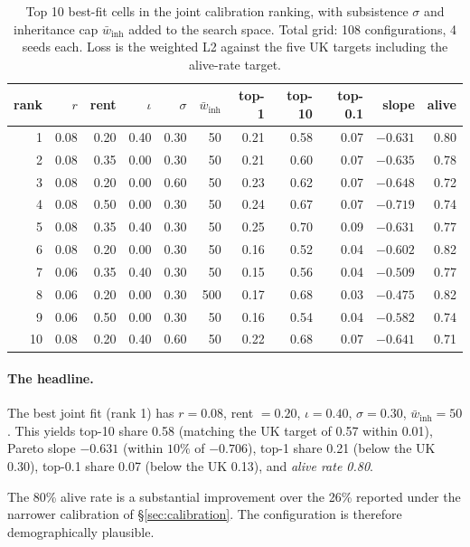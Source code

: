 \documentclass[11pt]{article}
\begin{document}
\begin{table}[h]
\centering
\small
\caption{Top 10 best-fit cells in the joint calibration ranking,
with subsistence $\sigma$ and inheritance cap $\bar{w}_\text{inh}$
added to the search space.  Total grid: 108 configurations, 4 seeds
each.  Loss is the weighted L2 against the five UK targets including
the alive-rate target.}
\label{tab:joint-cal}
\begin{tabular}{rrrrrrrrrrr}
\toprule
rank & $r$ & rent & $\iota$ & $\sigma$ & $\bar{w}_\text{inh}$
& top-1 & top-10 & top-0.1 & slope & alive \\
\midrule
  1 & 0.08 & 0.20 & 0.40 & 0.30 &  50 & 0.21 & 0.58 & 0.07 & $-0.631$ & 0.80 \\
  2 & 0.08 & 0.35 & 0.00 & 0.30 &  50 & 0.21 & 0.60 & 0.07 & $-0.635$ & 0.78 \\
  3 & 0.08 & 0.20 & 0.00 & 0.60 &  50 & 0.23 & 0.62 & 0.07 & $-0.648$ & 0.72 \\
  4 & 0.08 & 0.50 & 0.00 & 0.30 &  50 & 0.24 & 0.67 & 0.07 & $-0.719$ & 0.74 \\
  5 & 0.08 & 0.35 & 0.40 & 0.30 &  50 & 0.25 & 0.70 & 0.09 & $-0.631$ & 0.77 \\
  6 & 0.08 & 0.20 & 0.00 & 0.30 &  50 & 0.16 & 0.52 & 0.04 & $-0.602$ & 0.82 \\
  7 & 0.06 & 0.35 & 0.40 & 0.30 &  50 & 0.15 & 0.56 & 0.04 & $-0.509$ & 0.77 \\
  8 & 0.06 & 0.20 & 0.00 & 0.30 & 500 & 0.17 & 0.68 & 0.03 & $-0.475$ & 0.82 \\
  9 & 0.06 & 0.50 & 0.00 & 0.30 &  50 & 0.16 & 0.54 & 0.04 & $-0.582$ & 0.74 \\
 10 & 0.08 & 0.20 & 0.40 & 0.60 &  50 & 0.22 & 0.68 & 0.07 & $-0.641$ & 0.71 \\
\bottomrule
\end{tabular}
\end{table}

\paragraph{The headline.}  The best joint fit (rank 1) has $r =
0.08$, rent $= 0.20$, $\iota = 0.40$, $\sigma = 0.30$,
$\bar{w}_\text{inh} = 50$.  This yields top-10 share 0.58 (matching
the UK target of 0.57 within 0.01), Pareto slope $-0.631$ (within
$10\%$ of $-0.706$), top-1 share 0.21 (below the UK 0.30), top-0.1
share 0.07 (below the UK 0.13), and \emph{alive rate 0.80}.

The 80\% alive rate is a substantial improvement over the
26\% reported under the narrower calibration of
\S\ref{sec:calibration}.  The configuration is therefore
demographically plausible.
\end{document}
